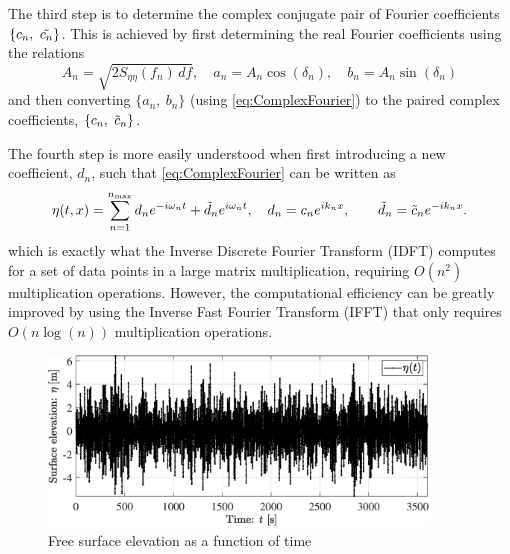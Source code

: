 The third step is to determine the complex conjugate pair of Fourier coefficients $\{c_n,\ \Tilde{c_n}\}$. This is achieved by first determining the real Fourier coefficients using the relations
\begin{equation}
    A_n = \sqrt{2 S_{\eta \eta}(f_n)\,df}, \quad a_n=A_n\cos{(\delta_n)}, \quad b_n=A_n\sin{(\delta_n)}
\end{equation}
and then converting $\{a_n,\ b_n \}$ (using \cref{eq:ComplexFourier}) to the paired complex coefficients, $\{c_n,\ \Tilde{c}_n\}$.

The fourth step is more easily understood when first introducing a new coefficient, $d_n$, such that \cref{eq:ComplexFourier} can be written as
\begin{equation}
        \eta(t,x) = \sum_{n=1}^{n_{\text{max}}} d_n e^{-i\omega_n t} + \Tilde{d}_n e^{i\omega_n t}
    \label{eq:ComplexFourier2}, \quad d_n = c_n e^{ik_n x}, \qquad \Tilde{d}_n = \Tilde{c}_n e^{-ik_n x}.
\end{equation}
which is exactly what the Inverse Discrete Fourier Transform (IDFT) computes for a set of data points in a large matrix multiplication, requiring $O(n^2)$ multiplication operations. However, the computational efficiency can be greatly improved by using the Inverse Fast Fourier Transform (IFFT) that only requires $O(n\log{(n)})$ multiplication operations.
\begin{figure}[htbp]
    \centering
    \includegraphics[width=0.9\textwidth]{Figures/Plots/SurfaceElevation.eps}
    \caption{Free surface elevation as a function of time}
    \label{fig:SurfaceElevation}
\end{figure}

